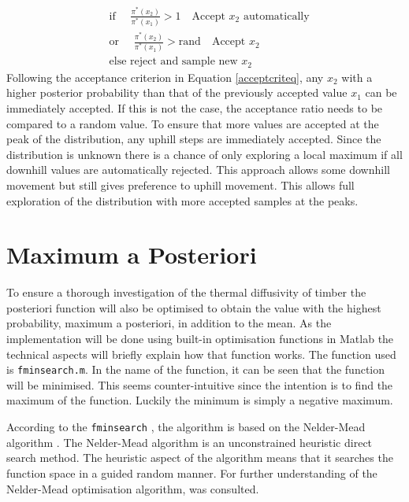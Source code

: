 		\begin{equation} \label{acceptcriteq}
		\begin{aligned}
		&\text{if  }\quad \frac{\pi^*  (x_2)}{\pi^* (x_1)} > 1 \quad \text{Accept } x_2 \text{ automatically}\\
		&\text{or  }\quad \frac{\pi^* (x_2)}{\pi^* (x_1)} > \text{rand}  \quad \text{Accept } x_2\\
		&\text{else reject and sample new } x_2
		\end{aligned}
		\end{equation}
Following the acceptance criterion in Equation \ref{acceptcriteq}, any $x_2$ with a higher posterior probability than that of the previously accepted value $x_1$ can be immediately accepted.
If this is not the case, the acceptance ratio needs to be compared to a random value.
To ensure that more values are accepted at the peak of the distribution, any uphill steps are immediately accepted.
Since the distribution is unknown there is a chance of only exploring a local maximum if all downhill values are automatically rejected.
This approach allows some downhill movement but still gives preference to uphill movement.
This allows full exploration of the distribution with more accepted samples at the peaks.

\section{Maximum a Posteriori}
To ensure a thorough investigation of the thermal diffusivity of timber the posteriori function will also be optimised to obtain the value with the highest probability, maximum a posteriori, in addition to the mean.
As the implementation will be done using built-in optimisation functions in Matlab the technical aspects will briefly explain how that function works.
The function used is \texttt{fminsearch.m}.
In the name of the function, it can be seen that the function will be minimised.
This seems counter-intuitive since the intention is to find the maximum of the function. 
Luckily the minimum is simply a negative maximum. 

According to the \texttt{fminsearch} \citet{Matlab} , the algorithm is based on the Nelder-Mead algorithm \citep{Lagarias:1998}.
The Nelder-Mead algorithm is an unconstrained heuristic direct search method.
The heuristic aspect of the algorithm means that it searches the function space in a guided random manner.
For further understanding of the Nelder-Mead optimisation algorithm, \citet{sachin:2016} was consulted.

